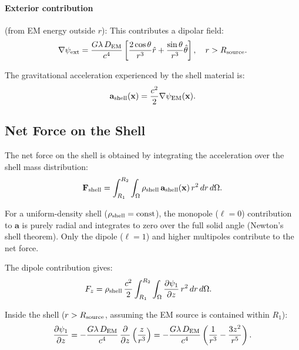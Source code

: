 \documentclass[aps,prd,twocolumn,superscriptaddress,floatfix,nofootinbib]{revtex4-2}
\newcommand{\avec}{\mathbf{a}}
\newcommand{\lam}{\lambda}
\begin{document}
\paragraph{Exterior contribution} (from EM energy outside $r$):
This contributes a dipolar field:
\begin{equation}
\nabla\psi_{\rm ext}
= \frac{G\lam\,D_{\rm EM}}{c^4}\left[
\frac{2\cos\theta}{r^3}\hat{r}
+ \frac{\sin\theta}{r^3}\hat{\theta}\right],
\quad r > R_{\rm source}.
\end{equation}

The gravitational acceleration experienced by the shell material is:
\begin{equation}
\avec_{\rm shell}(\mathbf{x}) = \frac{c^2}{2}\nabla\psi_{\rm EM}(\mathbf{x}).
\end{equation}

\subsection{Net Force on the Shell}
\label{sec:net-force}

The net force on the shell is obtained by integrating the acceleration
over the shell mass distribution:
\begin{equation}
\mathbf{F}_{\rm shell} = \int_{R_1}^{R_2}\int_\Omega
\rho_{\rm shell}\,\avec_{\rm shell}(\mathbf{x})
\,r^2\,dr\,d\Omega.
\end{equation}

For a uniform-density shell ($\rho_{\rm shell} = \text{const}$),
the monopole ($\ell = 0$) contribution to $\avec$ is purely
radial and integrates to zero over the full solid angle (Newton's
shell theorem). Only the dipole ($\ell = 1$) and higher multipoles
contribute to the net force.

The dipole contribution gives:
\begin{align}
F_z &= \rho_{\rm shell}\,\frac{c^2}{2}\int_{R_1}^{R_2}
\int_\Omega\frac{\partial\psi_1}{\partial z}
\,r^2\,dr\,d\Omega.
\end{align}

Inside the shell ($r > R_{\rm source}$, assuming the EM source
is contained within $R_1$):
\begin{equation}
\frac{\partial\psi_1}{\partial z} =
-\frac{G\lam\,D_{\rm EM}}{c^4}\,\frac{\partial}{\partial z}
\left(\frac{z}{r^3}\right)
= -\frac{G\lam\,D_{\rm EM}}{c^4}\left(\frac{1}{r^3}
- \frac{3z^2}{r^5}\right).
\end{equation}
\end{document}
